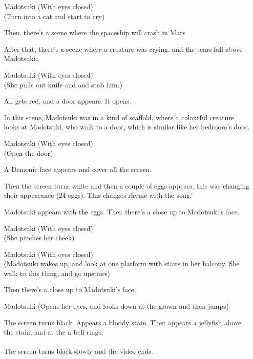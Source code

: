 \documentclass{screenplay}
\begin{document}
	\begin{dialogue}{Madotsuki}
		(With eyes closed)\\
		(Turn into a cat and start to cry)
	\end{dialogue}
	
	Then, there's a scene where the spaceship will crash in Mars
	
	After that, there's a scene where a creature was crying, and the tears fall above Madotsuki.
	
	\begin{dialogue}{Madotsuki}
		(With eyes closed)\\
		(She pulls out knife and and stab him.)
	\end{dialogue} 
	
	All gets red, and a door appears. It opens.
	
	In this scene, Madotsuki was in a kind of scaffold, where a colourful creature looks at Madotsuki, who walk to a door, which is similar like her bedroom's door.
	
	\begin{dialogue}{Madotsuki}
		(With eyes closed)\\		
		(Open the door)\\
	\end{dialogue}
	
	A Demonic face appears and cover all the screen.
	
	Then the screen turns white and then a couple of eggs appears, this was changing their appearance (24 eggs). This changes rhyme with the song.'
	
	 Madotsuki appears with the eggs. Then there's a close up to Madotsuki's face.
	 
	 \begin{dialogue}{Madotsuki}
		(With eyes closed)\\		
		(She pinches her cheek)\\
	\end{dialogue}
	
	\begin{dialogue}{Madotsuki}
		(With eyes closed)\\
		(Madotsuki wakes up, and look at one platform with stairs in her balcony. She walk to this thing, and go upstairs)
	\end{dialogue}
	Then there's a close up to Madotsuki's face.
	\begin{dialogue}{Madotsuki}
		(Opens her eyes, and looks down at the grown and then jumps)
	\end{dialogue}
	
	
	The screen turns black. Appears a bloody stain. Then appears a jellyfish above the stain, and at the a bell rings.\\~\\
	The screen turns black slowly and the video ends.
	
\end{document}
